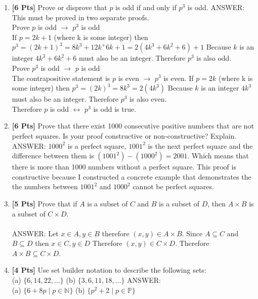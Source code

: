 \documentclass[12pt]{article}
\begin{document}
\begin{enumerate}
\item {\bf [6 Pts]} Prove or disprove that $p$ is odd if and only if $p^3$ is odd.\linebreak \linebreak
ANSWER: This must be proved in two separate proofs.\\
Prove $p$ is odd $\rightarrow$ $p^3$ is odd\\
If $p = 2k+1$ (where k is some integer) then $p^3 = (2k+1)^3 = 8k^3 + 12k^ + 6k +1 = 2(4k^3 + 6k^2 + 6)+1$ Because $k$ is an integer $4k^3 + 6k^2 + 6$ must also be an integer. Therefore $p^3$ is also odd.\\

Prove $p^3$ is odd $\rightarrow$ $p$ is odd\\
The contrapositive statement is $p$ is even $\rightarrow$ $p^3$ is even.
If $p = 2k$ (where k is some integer) then $p^3 = (2k)^3 = 8k^3= 2(4k^3)$ Because $k$ is an integer $4k^3$ must also be an integer. Therefore $p^3$ is also even.\\

Therefore $p$ is odd $\leftrightarrow$ $p^3$ is odd is true.

\item {\bf [6 Pts]} Prove that there exist 1000 consecutive positive numbers that are not perfect squares. Is your proof constructive or non-constructive? Explain.\linebreak \linebreak
ANSWER: $1000^2$ is a perfect square, $1001^2$ is the next perfect square and the difference between them is $(1001^2)-(1000^2)=2001$. Which means that there is more than 1000 numbers without a perfect square. This proof is constructive because I constructed a concrete example that demonstrates the the numbers between $1001^2$ and $1000^2$ cannot be perfect squares.

\item {\bf [5 Pts]} Prove that if $A$ is a subset of $C$ and $B$ is a subset of $D$, then $A \times B$ is a subset of $C \times D$.\\\\
ANSWER: Let $x \in A, y \in B$ therefore $(x,y) \in A \times B$. Since $A \subseteq C$ and $B \subseteq D$ then $x \in C, y \in D$ Therefore $(x,y) \in C \times D$. Therefore $A \times B \subseteq C \times D$.

\clearpage
\item {\bf [4 Pts]} Use set builder notation to describe the following sets:\\
       (a) $\{6, 14, 22, \ldots\}$ (b) $\{3, 6, 11, 18, \ldots\}$\linebreak \linebreak
       ANSWER:\\
(a) $\{6+8p \mid p \in \mathbb{N}\}$ (b) $\{p^2+2 \mid p \in \mathbb{P}\}$


\end{enumerate}
\end{document}
